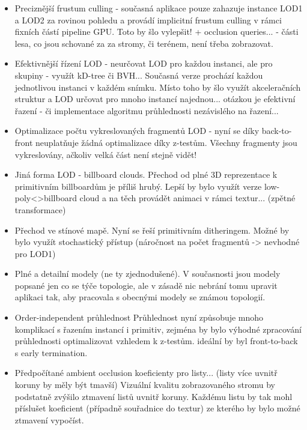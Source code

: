 \begin{itemize}

\item Preciznější frustum culling - současná aplikace pouze zahazuje instance LOD1 a LOD2 za rovinou pohledu a provádí implicitní frustum culling v rámci fixních částí pipeline GPU. Toto by šlo vylepšit! + occlusion queries... - části lesa, co jsou schované za za stromy, či terénem, není třeba zobrazovat.

\item Efektivnější řízení LOD - neurčovat LOD pro každou instanci, ale pro skupiny - využít kD-tree či BVH... Současná verze prochází každou jednotlivou instanci v každém snímku. Místo toho by šlo využít akceleračních struktur a LOD určovat pro mnoho instancí najednou... otázkou je efektivní řazení - či implementace algoritmu průhlednosti nezávislého na řazení...

\item Optimalizace počtu vykreslovaných fragmentů LOD - nyní se díky back-to-front neuplatňuje žádná optimalizace díky z-testům. Všechny fragmenty jsou vykreslovány, ačkoliv velká část není stejně vidět!

\item Jiná forma LOD - billboard clouds. Přechod od plné 3D reprezentace k primitivním billboardům je příliš hrubý. Lepší by bylo využít verze low-poly<>billboard cloud a na těch provádět animaci v rámci textur... (zpětné transformace)



%
\item Přechod ve stínové mapě. Nyní se řeší primitivním ditheringem. Možné by bylo využít stochastický přístup (náročnost na počet fragmentů -> nevhodné pro LOD1)

\item Plné a detailní modely (ne ty zjednodušené). V současnosti jsou modely popsané jen co se týče topologie, ale v zásadě nic nebrání tomu upravit aplikaci tak, aby pracovala s obecnými modely se známou topologií.

\item Order-independent průhlednost
Průhlednost nyní způsobuje mnoho komplikací s řazením instancí i primitiv, zejména by bylo výhodné zpracování průhlednosti optimalizovat vzhledem k z-testům. ideální by byl front-to-back s early termination.


\item Předpočítané ambient occlusion koeficienty pro listy... (listy více uvnitř koruny by měly být tmavší)
Vizuální kvalitu zobrazovaného stromu by podstatně zvýšilo ztmavení listů uvnitř koruny. Každému listu by tak mohl příslušet koeficient (případně souřadnice do textur) ze kterého by bylo možné ztmavení vypočíst.


\end{itemize}
